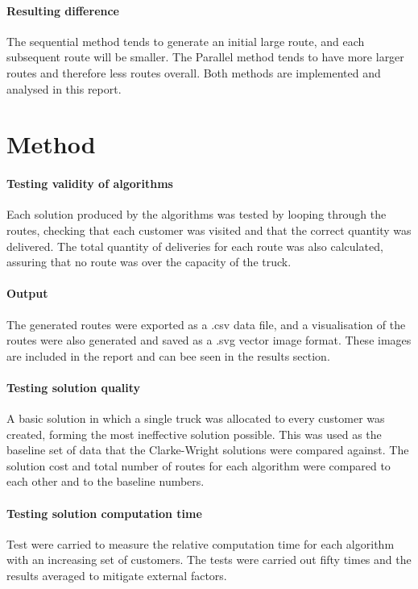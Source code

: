 \documentclass[conference]{acmsiggraph}
\begin{document}
\paragraph{Resulting difference}
The sequential method tends to generate an initial large route, and each subsequent route will be smaller. The Parallel method tends to have more larger routes and therefore less routes overall. Both methods are implemented and analysed in this report.

\section{Method}
\paragraph{Testing validity of algorithms}
Each solution produced by the algorithms was tested by looping through the routes, checking that each customer was visited and that the correct quantity was delivered. The total quantity of deliveries for each route was also calculated, assuring that no route was over the capacity of the truck.

\paragraph{Output}
The generated routes were exported as a .csv data file, and a visualisation of the routes were also generated and saved as a .svg vector image format. These images are included in the report and can bee seen in the results section.

\paragraph{Testing solution quality}
A basic solution in which a single truck was allocated to every customer was created, forming the most ineffective solution possible. This was used as the baseline set of data that the Clarke-Wright solutions were compared against. The solution cost and total number of routes for each algorithm were compared to each other and to the baseline numbers.

\paragraph{Testing solution computation time}
Test were carried to measure the relative computation time for each algorithm with an increasing set of customers. The tests were carried out fifty times and the results averaged to mitigate external factors.
\end{document}
